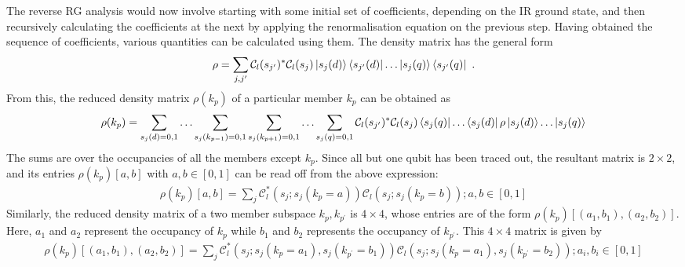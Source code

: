The reverse RG analysis would now involve starting with some initial set of coefficients, depending on the IR ground state, and then recursively calculating the coefficients at the next by applying the renormalisation equation on the previous step. Having obtained the sequence of coefficients, various quantities can be calculated using them. The density matrix has the general form
\begin{equation}\begin{aligned}
\rho = \sum_{j,j^\prime}\mathcal{C}_l(s_{j^\prime})^*\mathcal{C}_l(s_{j}) \ket{s_j(d)}\bra{s_{j^\prime}(d)}\ldots\ket{s_j(q)}\bra{s_{j^\prime}(q)}~.
\end{aligned}\end{equation}
From this, the reduced density matrix \(\rho(k_p)\) of a particular member \(k_p\) can be obtained as
\begin{equation}\begin{aligned}
\rho(k_p) = \sum_{s_j(d)=0,1}\ldots\sum_{s_j(k_{p-1})=0,1}\sum_{s_j(k_{p+1})=0,1}\ldots\sum_{s_j(q)=0,1}\mathcal{C}_l(s_{j^\prime})^*\mathcal{C}_l(s_{j})\bra{s_j(q)}\ldots\bra{s_j(d)}\rho\ket{s_j(d)}\ldots\ket{s_j(q)}
\end{aligned}\end{equation}
The sums are over the occupancies of all the members except \(k_p\). Since all but one qubit has been traced out, the resultant matrix is \(2\times 2\), and its entries \(\rho(k_p)[a,b]\) with \(a,b \in [0,1]\) can be read off from the above expression:
\begin{equation}\begin{aligned}
	\rho(k_p)[a,b] = \sum_{j}\mathcal{C}_l^*(s_j;s_j(k_p=a))\mathcal{C}_l(s_j;s_j(k_p=b)); a,b \in [0,1]
\end{aligned}\end{equation}
Similarly, the reduced density matrix of a two member subspace \(k_p,k_{p^\prime}\) is \(4\times 4\), whose entries are of the form \(\rho(k_p)[(a_1,b_1), (a_2,b_2)]\). Here, \(a_1\) and \(a_2\) represent the occupancy of \(k_p\) while \(b_1\) and \(b_2\) represents the occupancy of \(k_{p^\prime}\). This \(4\times 4\) matrix is given by
\begin{equation}\begin{aligned}
	\rho(k_p)[(a_1,b_1), (a_2,b_2)] = \sum_{j}\mathcal{C}_l^*(s_j;s_j(k_p=a_1),s_j(k_{p^\prime}=b_1))\mathcal{C}_l(s_j;s_j(k_p=a_1),s_j(k_{p^\prime}=b_2)); a_i,b_i \in [0,1]
\end{aligned}\end{equation}
